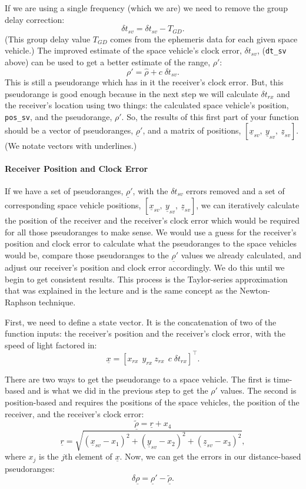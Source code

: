 \documentclass[12pt]{article}
\renewcommand{\vec}[1]     {\underline{#1}}
\begin{document}
If we are using a single frequency (which we are) we need to remove the group
delay correction:
\[ \delta t_{sv} = \delta t_{sv} - T_{GD} . \]
(This group delay value $T_{GD}$ comes from the ephemeris data for each given
space vehicle.)  The improved estimate of the space vehicle's clock error,
$\delta t_{sv}$, (\lstinline{dt_sv} above) can be used to get a better estimate
of the range, $\rho'$:
\[ \rho' = \hat{\rho} + c\; \delta t_{sv} . \]
This is still a pseudorange which has in it the receiver's clock error.  But,
this pseudorange is good enough because in the next step we will calculate
$\delta t_{rx}$ and the receiver's location using two things: the calculated
space vehicle's position, \lstinline{pos_sv}, and the pseudorange, $\rho'$.  So,
the results of this first part of your function should be a vector of
pseudoranges, $\vec{\rho}'$, and a matrix of positions, $[\vec{x}_{sv},\
\vec{y}_{sv},\ \vec{z}_{sv}]$.  (We notate vectors with underlines.)

\paragraph{Receiver Position and Clock Error}

If we have a set of pseudoranges, $\vec{\rho}'$, with the $\delta t_{sv}$ errors
removed and a set of corresponding space vehicle positions, $[\vec{x}_{sv},\
\vec{y}_{sv},\ \vec{z}_{sv}]$, we can iteratively calculate the position of the
receiver and the receiver's clock error which would be required for all those
pseudoranges to make sense.  We would use a guess for the receiver's position
and clock error to calculate what the pseudoranges to the space vehicles would
be, compare those pseudoranges to the $\vec{\rho}'$ values we already
calculated, and adjust our receiver's position and clock error accordingly.  We
do this until we begin to get consistent results.  This process is the
Taylor-series approximation that was explained in the lecture and is the same
concept as the Newton-Raphson technique.

First, we need to define a state vector.  It is the concatenation of two of the
function inputs: the receiver's position and the receiver's clock error, with
the speed of light factored in:
\[ \vec{x} = [ x_{rx} \ \ y_{rx} \ z_{rx} \ \ c\; \delta t_{rx} ]^\top . \]

There are two ways to get the pseudorange to a space vehicle.  The first is
time-based and is what we did in the previous step to get the $\rho'$ values.
The second is position-based and requires the positions of the space vehicles,
the position of the receiver, and the receiver's clock error:
\begin{equation}
   \vec{\tilde{\rho}} = \vec{r} + x_4
   \label{eq_rho_tilde}
\end{equation}
\[ \vec{r} = \sqrt{
   \left( \vec{x}_{sv} - x_1 \right)^2
      + \left( \vec{y}_{sv} - x_2 \right)^2
      + \left( \vec{z}_{sv} - x_3 \right)^2 } , \]
where $x_j$ is the $j$th element of $\vec{x}$.  Now, we can get the errors in
our distance-based pseudoranges:
\[ \delta \vec{\rho} = \vec{\rho}' - \vec{\tilde{\rho}} . \]
\end{document}
